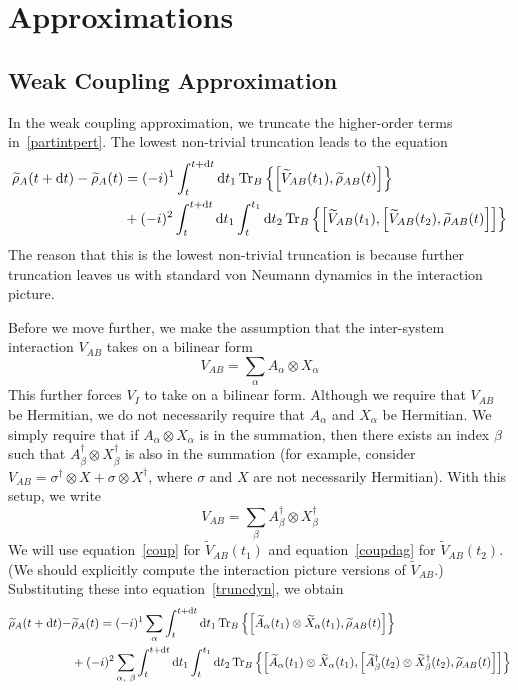 \documentclass{article}
\newcommand{\ten}{\otimes}
\newcommand{\Ptra}[2]{\Tr_{#1}\left\{#2\right\}}
\newcommand{\til}[1]{\widetilde{#1}}
\begin{document}
\section{Approximations}

\subsection{Weak Coupling Approximation}

In the weak coupling approximation, we truncate the higher-order terms in~\ref{partintpert}. The lowest non-trivial truncation leads to the equation
\begin{align}\label{truncdyn}
\begin{split}
\til{\rho}_{A}(t+\dd{t}) - \til{\rho}_{A}(t) &= (-i)^1\int_t^{t+\dd{t}}\dd{t_1}\Ptra{B}{\comm{\til{V}_{AB}(t_1)}{\til{\rho}_{AB}(t)}}\\
&+(-i)^2\int_t^{t+\dd{t}}\dd{t_1}\int_t^{t_1}\dd{t_2}\Ptra{B}{\comm{\til{V}_{AB}(t_1)}{\comm{\til{V}_{AB}(t_2)}{\til{\rho}_{AB}(t)}}}
\end{split}
\end{align}
The reason that this is the lowest non-trivial truncation is because further truncation leaves us with standard von Neumann dynamics in the interaction picture.

Before we move further, we make the assumption that the inter-system interaction $V_{AB}$ takes on a bilinear form
\begin{equation}\label{coup}
V_{AB} = \sum_{\alpha} A_{\alpha}\ten X_{\alpha}
\end{equation}
This further forces $V_I$ to take on a bilinear form. Although we require that $V_{AB}$ be Hermitian, we do not necessarily require that $A_{\alpha}$ and $X_{\alpha}$ be Hermitian. We simply require that if $A_{\alpha}\ten X_{\alpha}$ is in the summation, then there exists an index $\beta$ such that $A_{\beta}^{\dag}\ten X_{\beta}^{\dag}$ is also in the summation (for example, consider $V_{AB} = \sigma^{\dag}\ten X + \sigma\ten X^{\dag}$, where $\sigma$ and $X$ are not necessarily Hermitian). With this setup, we write
\begin{equation}\label{coupdag}
V_{AB} = \sum_{\beta} A_{\beta}^{\dag}\ten X_{\beta}^{\dag}
\end{equation}
We will use equation~\ref{coup} for $\til{V}_{AB}(t_1)$ and equation~\ref{coupdag} for $\til{V}_{AB}(t_2)$. (We should explicitly compute the interaction picture versions of $\til{V}_{AB}$.) Substituting these into equation~\ref{truncdyn}, we obtain
\begin{align}\label{ugh}
\begin{split}
\til{\rho}_{A}(t+\dd{t}) - &\til{\rho}_{A}(t) = (-i)^1\sum_{\alpha}\int_t^{t+\dd{t}}\dd{t_1}\Ptra{B}{\comm{\til{A}_{\alpha}(t_1)\ten \til{X}_{\alpha}(t_1)}{\til{\rho}_{AB}(t)}}\\
&+(-i)^2\sum_{\alpha,\ \beta}\int_t^{t+\dd{t}}\dd{t_1}\int_t^{t_1}\dd{t_2}\Ptra{B}{\comm{\til{A}_{\alpha}(t_1)\ten \til{X}_{\alpha}(t_1)}{\comm{\til{A}_{\beta}^{\dag}(t_2)\ten \til{X}_{\beta}^{\dag}(t_2)}{\til{\rho}_{AB}(t)}}}
\end{split}
\end{align}
\end{document}
